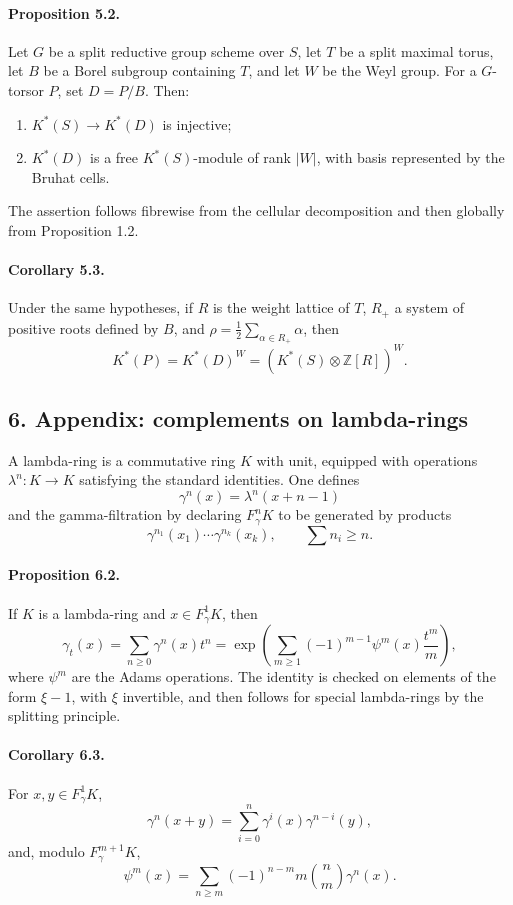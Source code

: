 \documentclass[12pt]{article}
\newcommand{\ZZ}{\mathbb Z}
\begin{document}
\paragraph{Proposition 5.2.}
Let $G$ be a split reductive group scheme over $S$, let $T$ be a split maximal torus, let $B$ be a Borel subgroup containing $T$, and let $W$ be the Weyl group. For a $G$-torsor $P$, set $D=P/B$. Then:
\begin{enumerate}[label=\roman*)]
\item $K^*(S)\to K^*(D)$ is injective;
\item $K^*(D)$ is a free $K^*(S)$-module of rank $|W|$, with basis represented by the Bruhat cells.
\end{enumerate}
The assertion follows fibrewise from the cellular decomposition and then globally from Proposition 1.2.

\paragraph{Corollary 5.3.}
Under the same hypotheses, if $R$ is the weight lattice of $T$, $R_+$ a system of positive roots defined by $B$, and $\rho=\frac12\sum_{\alpha\in R_+}\alpha$, then
\[
K^*(P)=K^*(D)^W=(K^*(S)\otimes\ZZ[R])^W.
\]

\subsection*{6. Appendix: complements on lambda-rings}

A lambda-ring is a commutative ring $K$ with unit, equipped with operations $\lambda^n:K\to K$ satisfying the standard identities. One defines
\[
\gamma^n(x)=\lambda^n(x+n-1)
\]
and the gamma-filtration by declaring $F^n_\gamma K$ to be generated by products
\[
\gamma^{n_1}(x_1)\cdots\gamma^{n_k}(x_k),\qquad \sum n_i\geq n.
\]

\paragraph{Proposition 6.2.}
If $K$ is a lambda-ring and $x\in F^1_\gamma K$, then
\[
\gamma_t(x)=\sum_{n\geq0}\gamma^n(x)t^n
=\exp\left(\sum_{m\geq1}(-1)^{m-1}\psi^m(x)\frac{t^m}{m}\right),
\]
where $\psi^m$ are the Adams operations. The identity is checked on elements of the form $\xi-1$, with $\xi$ invertible, and then follows for special lambda-rings by the splitting principle.

\paragraph{Corollary 6.3.}
For $x,y\in F^1_\gamma K$,
\[
\gamma^n(x+y)=\sum_{i=0}^n\gamma^i(x)\gamma^{n-i}(y),
\]
and, modulo $F^{m+1}_\gamma K$,
\[
\psi^m(x)=\sum_{n\geq m}(-1)^{n-m}m{n\choose m}\gamma^n(x).
\]
\end{document}
